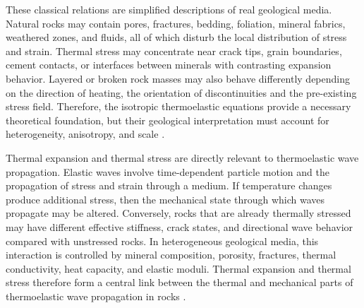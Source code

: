These classical relations are simplified descriptions of real geological media. Natural rocks may contain pores, fractures, bedding, foliation, mineral fabrics, weathered zones, and fluids, all of which disturb the local distribution of stress and strain. Thermal stress may concentrate near crack tips, grain boundaries, cement contacts, or interfaces between minerals with contrasting expansion behavior. Layered or broken
rock masses may also behave differently depending on the direction of heating, the orientation of discontinuities and the pre-existing stress field. Therefore, the isotropic thermoelastic equations provide a necessary theoretical foundation, but their geological interpretation must account for heterogeneity, anisotropy, and scale \cite{jaeger2007,mavko2009,turcotte2014}.

Thermal expansion and thermal stress are directly relevant to thermoelastic wave propagation. Elastic waves involve time-dependent particle motion and the propagation of stress and strain through a medium. If temperature changes produce additional stress, then the mechanical state through which waves propagate may be altered. Conversely, rocks that are already thermally stressed may have different effective stiffness, crack states, and directional wave behavior compared with unstressed rocks. In heterogeneous geological media, this interaction is controlled by mineral composition, porosity, fractures, thermal conductivity, heat capacity, and elastic moduli. Thermal expansion and thermal stress therefore form a central link between the thermal and mechanical parts of thermoelastic wave propagation in rocks \cite{aki2002,nowacki1986,mavko2009}.